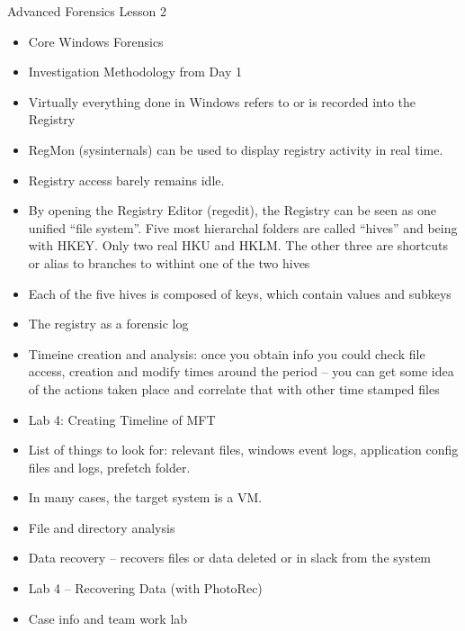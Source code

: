 \documentclass[12pt]{article}
\begin{document}
\newline
Advanced Forensics Lesson 2
\begin{itemize}
\item Core Windows Forensics
\item Investigation Methodology from Day 1
\item Virtually everything done in Windows refers to or is recorded into the Registry
\item RegMon (sysinternals) can be used to display registry activity in real time. 
\item Registry access barely remains idle.
\item By opening the Registry Editor (regedit), the Registry can be seen as one unified “file system”. Five most hierarchal folders are called “hives” and being with HKEY. Only two real HKU and HKLM. The other three are shortcuts or alias to branches to withint one of the two hives
\item Each of the five hives is composed of keys, which contain values and subkeys
\item The registry as a forensic log
\item Timeine creation and analysis: once you obtain info you could check file access, creation and modify times around the period – you can get some idea of the actions taken place and correlate that with other time stamped files
\item Lab 4: Creating Timeline of MFT
\item List of things to look for: relevant files, windows event logs, application config files and logs, prefetch folder. 
\item In many cases, the target system is a VM.
\item File and directory analysis
\item Data recovery – recovers files or data deleted or in slack from the system
\item Lab 4 – Recovering Data (with PhotoRec)
\item Case info and team work lab
\end{itemize}

 
\end{document}
